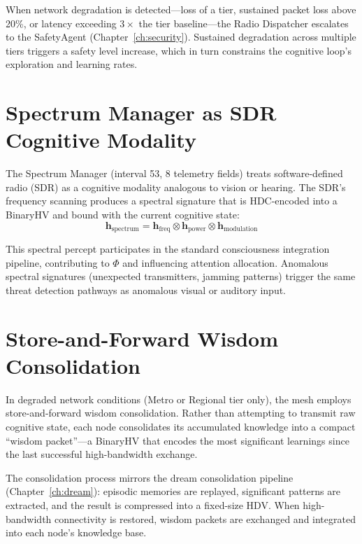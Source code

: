 \documentclass[12pt]{book}
\newcommand{\bind}{\otimes}
\begin{document}
When network degradation is detected---loss of a tier, sustained packet loss above 20\%, or latency exceeding $3\times$ the tier baseline---the Radio Dispatcher escalates to the SafetyAgent (Chapter~\ref{ch:security}). Sustained degradation across multiple tiers triggers a safety level increase, which in turn constrains the cognitive loop's exploration and learning rates.

\section{Spectrum Manager as SDR Cognitive Modality}

The Spectrum Manager (interval 53, 8 telemetry fields) treats software-defined radio (SDR) as a cognitive modality analogous to vision or hearing. The SDR's frequency scanning produces a spectral signature that is HDC-encoded into a BinaryHV and bound with the current cognitive state:
\begin{equation}
\mathbf{h}_{\text{spectrum}} = \mathbf{h}_{\text{freq}} \bind \mathbf{h}_{\text{power}} \bind \mathbf{h}_{\text{modulation}}
\end{equation}

This spectral percept participates in the standard consciousness integration pipeline, contributing to $\Phi$ and influencing attention allocation. Anomalous spectral signatures (unexpected transmitters, jamming patterns) trigger the same threat detection pathways as anomalous visual or auditory input.

\section{Store-and-Forward Wisdom Consolidation}

In degraded network conditions (Metro or Regional tier only), the mesh employs store-and-forward wisdom consolidation. Rather than attempting to transmit raw cognitive state, each node consolidates its accumulated knowledge into a compact ``wisdom packet''---a BinaryHV that encodes the most significant learnings since the last successful high-bandwidth exchange.

The consolidation process mirrors the dream consolidation pipeline (Chapter~\ref{ch:dream}): episodic memories are replayed, significant patterns are extracted, and the result is compressed into a fixed-size HDV. When high-bandwidth connectivity is restored, wisdom packets are exchanged and integrated into each node's knowledge base.
\end{document}
